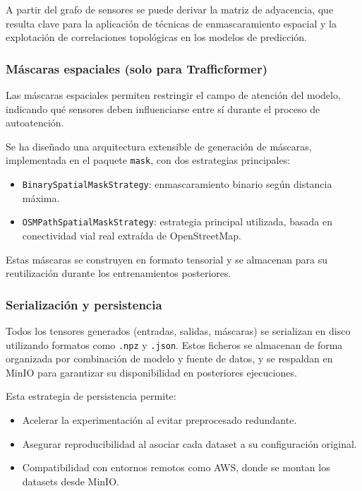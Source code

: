 A partir del grafo de sensores se puede derivar la matriz de adyacencia, que resulta clave para la aplicación de técnicas de enmascaramiento espacial y la explotación de correlaciones topológicas en los modelos de predicción.

\subsubsection*{Máscaras espaciales (solo para Trafficformer)}

Las máscaras espaciales permiten restringir el campo de atención del modelo, indicando qué sensores deben influenciarse entre sí durante el proceso de autoatención.

Se ha diseñado una arquitectura extensible de generación de máscaras, implementada en el paquete \texttt{mask}, con dos estrategias principales:

\begin{itemize}
	\item \texttt{BinarySpatialMaskStrategy}: enmascaramiento binario según distancia máxima.
	\item \texttt{OSMPathSpatialMaskStrategy}: estrategia principal utilizada, basada en conectividad vial real extraída de OpenStreetMap.
\end{itemize}

Estas máscaras se construyen en formato tensorial y se almacenan para su reutilización durante los entrenamientos posteriores.

\subsubsection*{Serialización y persistencia}

Todos los tensores generados (entradas, salidas, máscaras) se serializan en disco utilizando formatos como \texttt{.npz} y \texttt{.json}. Estos ficheros se almacenan de forma organizada por combinación de modelo y fuente de datos, y se respaldan en MinIO para garantizar su disponibilidad en posteriores ejecuciones.

Esta estrategia de persistencia permite:

\begin{itemize}
	\item Acelerar la experimentación al evitar preprocesado redundante.
	\item Asegurar reproducibilidad al asociar cada dataset a su configuración original.
	\item Compatibilidad con entornos remotos como AWS, donde se montan los datasets desde MinIO.
\end{itemize}

